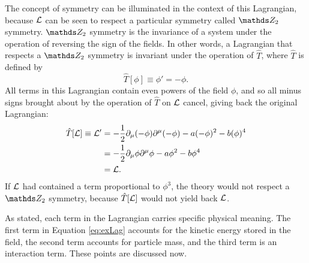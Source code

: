 The concept of symmetry can be illuminated in the context of this Lagrangian, because $\mathcal{L}$ can be seen to respect a particular symmetry called $\ztwo$ symmetry. $\ztwo$ symmetry is the invariance of a system under the operation of reversing the sign of the fields. In other words, a Lagrangian that respects a $\ztwo$ symmetry is invariant under the operation of $\hat{T}$, where $\hat{T}$ is defined by 
\begin{equation}
\hat{T}[\phi] \equiv \phi' = -\phi.
\end{equation}
All terms in this Lagrangian contain even powers of the field $\phi$, and so all minus signs brought about by the operation of $\hat{T}$ on $\mathcal{L}$ cancel, giving back the original Lagrangian:
 \begin{align}
 \begin{split}
\hat{T}[\mathcal{L}] \equiv \mathcal{L}' &= -\frac{1}{2}\partial_\mu (-\phi) \partial^\mu (-\phi)  - a(-\phi)^2 - b(\phi)^4 \\
&= -\frac{1}{2}\partial_\mu \phi \partial^\mu \phi  - a\phi^2 - b\phi^4 \\
&= \mathcal{L}.
 \label{eq:exLag2}
  \end{split}
\end{align} 
If $\mathcal{L}$ had contained a term proportional to $\phi^3$, the theory would not respect a $\ztwo$ symmetry, because $\hat{T}[\mathcal{L}]$ would not yield back $\mathcal{L}$.

As stated, each term in the Lagrangian carries specific physical meaning. The first term in Equation \ref{eq:exLag} accounts for the kinetic energy stored in the field, the second term accounts for particle mass, and the third term is an interaction term. These points are discussed now.

